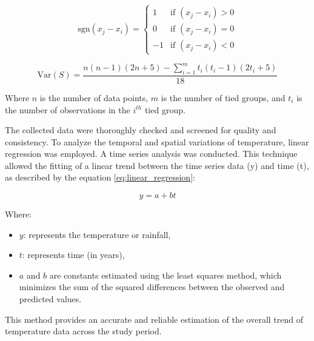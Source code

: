 \begin{equation}
  \text{sgn}(x_j - x_i) = 
  \begin{cases} 
  1 & \text{if } (x_j - x_i) > 0 \\ 
  0 & \text{if } (x_j - x_i) = 0 \\ 
  -1 & \text{if } (x_j - x_i) < 0 
  \end{cases} \tag{2} 
  \label{eq:sgn}
  \end{equation}
  
\begin{equation}
  \text{Var}(S) = \frac{n(n-1)(2n+5) - \sum_{i=1}^{m} t_i(t_i-1)(2t_i+5)}{18} \tag{3}
  \label{eq:variance}
  \end{equation}

Where \( n \) is the number of data points, \( m \) is the number of tied groups, and \( t_i \) is the number of observations in the \( i^{th} \) tied group.

The collected data were thoroughly checked and screened for quality and consistency. To analyze the temporal and spatial variations of temperature, linear regression was employed. A time series analysis was conducted. This technique allowed the fitting of a linear trend between the time series data (y) and time (t), as described by the equation \ref{eq:linear_regression}:

\begin{equation}
  y = a + bt \tag{4}
\label{eq:linear_regression}
\end{equation}

Where:
\begin{itemize}
  \item \( y \): represents the temperature or rainfall,
  \item \( t \): represents time (in years),
  \item \( a \) and \( b \) are constants estimated using the least squares method, which minimizes the sum of the squared differences between the observed and predicted values.
\end{itemize}

This method provides an accurate and reliable estimation of the overall trend of temperature data across the study period.


